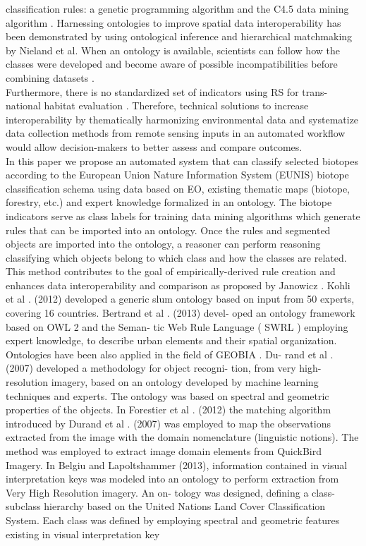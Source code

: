 \documentclass[authoryear, review,12pt,number]{elsarticle}
\begin{document}
classification rules: a genetic programming algorithm
\citep{Forestier2012470} and the C4.5 data mining algorithm
\citep{Sheeren2006ML}. Harnessing ontologies to improve spatial data
interoperability has been demonstrated by using ontological inference and
hierarchical matchmaking by Nieland et al. \citep{Nieland2015}  When an ontology
is available, scientists can follow how the classes were developed and become
aware of possible incompatibilities before combining datasets
\citep{Janowicz2012}.
\\
Furthermore, there is no standardized set of indicators
using RS for trans-national habitat evaluation \citep{Lucas2015}. Therefore,
technical solutions to increase interoperability by thematically harmonizing
environmental data and systematize data collection methods from remote sensing
inputs in an automated workflow would allow decision-makers to better assess and
compare outcomes. \\

In this paper we propose an automated system that can
classify selected biotopes according to the European Union Nature Information
System (EUNIS) biotope classification schema using data based on EO, existing
thematic maps (biotope, forestry, etc.) and expert knowledge formalized in an
ontology.  The biotope indicators serve as class labels for training data mining
algorithms which generate rules that can be imported into an ontology. Once the
rules and segmented objects are imported into the ontology, a reasoner can
perform reasoning classifying which objects belong to which class and how the
classes are related. This method contributes to the goal of empirically-derived
rule creation and enhances data interoperability and comparison as proposed by
Janowicz \citep{Janowicz2012}.
Kohli et al .
(2012) developed a generic slum ontology based on input from 50 experts,
covering 16 countries. Bertrand et al . (2013) devel- oped an ontology framework
based on OWL 2 and the Seman- tic Web Rule Language ( SWRL ) employing expert
knowledge, to describe urban elements and their spatial organization.
Ontologies have been also applied in the field of GEOBIA . Du- rand et al .
(2007) developed a methodology for object recogni- tion, from very
high-resolution imagery, based on an ontology developed by machine learning
techniques and experts. The ontology was based on spectral and geometric
properties of the objects. In Forestier et al . (2012) the matching algorithm
introduced by Durand et al . (2007) was employed to map the observations
extracted from the image with the domain nomenclature (linguistic notions). The
method was employed to extract image domain elements from QuickBird Imagery.
In Belgiu and Lapoltshammer (2013), information contained in visual
interpretation keys was modeled into an ontology to perform extraction from Very
High Resolution imagery. An on- tology was designed, defining a class- subclass
hierarchy based on the United Nations Land Cover Classification System. Each
class was defined by employing spectral and geometric features existing in
visual interpretation key
\end{document}
